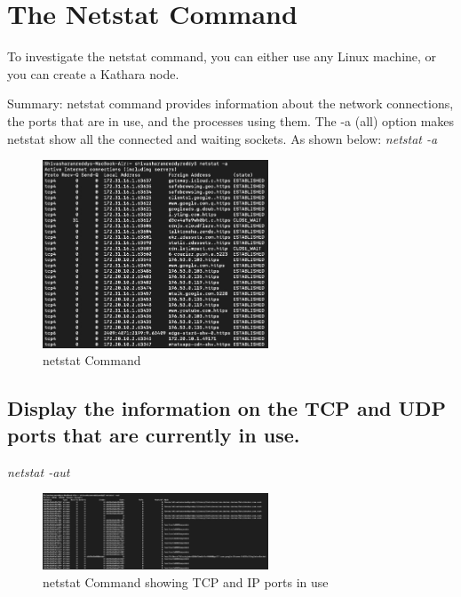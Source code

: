\label{The Netstat Command}
\chapter{The Netstat Command}

To investigate the netstat command, you can either use any Linux machine, or you can create a Kathara node.

Summary: netstat command provides information about the network connections, the ports that are in use, and the processes using them. 
The -a (all) option makes netstat show all the connected and waiting sockets. As shown below:
\textsl{ netstat -a}

\begin{figure}[H]
\Centering
  \includegraphics[width=0.6\textwidth]{Images/Image1-1-Netstat.jpg}
  \caption{netstat Command}
  \label{fig:1.1}
\end{figure}

\section{Display the information on the TCP and UDP ports that are currently in use.}
\textsl{ netstat -aut}
\begin{figure}[H]
\centering
  \includegraphics[width=0.6\textwidth]{Images/Image1-2-netstatTCPUDP.jpg}
  \caption{netstat Command showing TCP and IP ports in use}
  \label{fig:1.2}
\end{figure}
